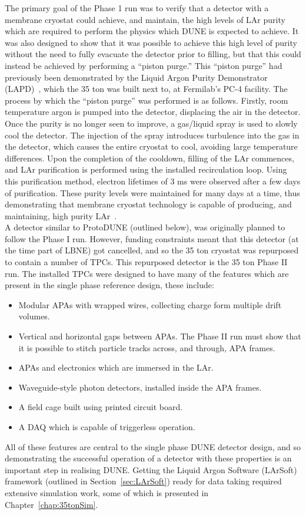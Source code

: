 The primary goal of the Phase 1 run was to verify that a detector with a membrane cryostat could achieve, and maintain, the high levels of LAr purity which are required to perform the physics which DUNE is expected to achieve. It was also designed to show that it was possible to achieve this high level of purity without the need to fully evacuate the detector prior to filling, but that this could instead be achieved by performing a ``piston purge.'' This ``piston purge'' had previously been demonstrated by the Liquid Argon Purity Demonstrator (LAPD)~\citep{LAPD}, which the 35 ton was built next to, at Fermilab's PC-4 facility. The process by which the ``piston purge'' was performed is as follows. Firstly, room temperature argon is pumped into the detector, displacing the air in the detector. Once the purity is no longer seen to improve, a gas/liquid spray is used to slowly cool the detector. The injection of the spray introduces turbulence into the gas in the detector, which causes the entire cryostat to cool, avoiding large temperature differences. Upon the completion of the cooldown, filling of the LAr commences, and LAr purification is performed using the installed recirculation loop. Using this purification method, electron lifetimes of 3 ms were observed after a few days of purification. These purity levels were maintained for many days at a time, thus demonstrating that membrane cryostat technology is capable of producing, and maintaining, high purity LAr~\citep{35tonMontanari, 35tonHahn}. \\

A detector similar to ProtoDUNE (outlined below), was originally planned to follow the Phase I run. However, funding constraints meant that this detector (at the time part of LBNE) got cancelled, and so the 35 ton cryostat was repurposed to contain a number of TPCs. This repurposed detector is the 35 ton Phase II run. The installed TPCs were designed to have many of the features which are present in the single phase reference design, these include:
\begin{itemize}
\item Modular APAs with wrapped wires, collecting charge form multiple drift volumes.
\item Vertical and horizontal gaps between APAs. The Phase II run must show that it is possible to stitch particle tracks across, and through, APA frames.
\item APAs and electronics which are immersed in the LAr.
\item Waveguide-style photon detectors, installed inside the APA frames.
\item A field cage built using printed circuit board.
\item A DAQ which is capable of triggerless operation.
\end{itemize}
All of these features are central to the single phase DUNE detector design, and so demonstrating the successful operation of a detector with these properties is an important step in realising DUNE. Getting the Liquid Argon Software (LArSoft) framework (outlined in Section~\ref{sec:LArSoft}) ready for data taking required extensive simulation work, some of which is presented in Chapter~\ref{chap:35tonSim}. \\

